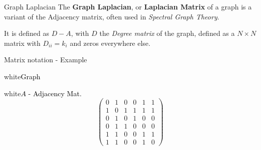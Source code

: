 \begin{textbox}{Graph Laplacian}
  The \textbf{Graph Laplacian}, or \textbf{Laplacian Matrix} of a graph is a variant of the Adjacency matrix, often used in \textit{Spectral Graph Theory}.

  It is defined as $D-A$, with $D$ the \textit{Degree matrix} of the graph, defined as a $N \times N$ matrix with $D_{ii}=k_i$ and zeros everywhere else.
\end{textbox}


\begin{textbox}{Matrix notation - Example}
  \begin{multibox}{2}
    \begin{subbox}{white}{\textcolor{black}{Graph}}
      \centering
      \adjustbox{width=0.8\textwidth }{
        \begin{tikzpicture}[scale=0.3,rotate=0][every node/.style={inner sep=0,outer sep=0}]
          \clip (0,-0.5) rectangle (6,6.5);
          \Vertex[x=1.781,y=1.331,size=0.3,opacity=0.8,label=1]{0}
          \Vertex[x=3.083,y=3.151,size=0.3,opacity=0.8,label=2]{1}
          \Vertex[x=2.831,y=0.200,size=0.3,opacity=0.8,label=6]{5}
          \Vertex[x=4.058,y=1.136,size=0.3,opacity=0.8,label=5]{4}
          \Vertex[x=4.219,y=5.643,size=0.3,opacity=0.8,label=3]{2}
          \Vertex[x=2.386,y=5.800,size=0.3,opacity=0.8,label=4]{3}
          \Edge[](0)(1)
          \Edge[](0)(5)
          \Edge[](0)(4)
          \Edge[](1)(2)
          \Edge[](1)(3)
          \Edge[](1)(4)
          \Edge[](1)(5)
          \Edge[](5)(4)
          \Edge[](4)(4)
          \Edge[](2)(3)
        \end{tikzpicture}
      }%
    \end{subbox}
    \begin{subbox}{white}{\textcolor{black}{$A$ - Adjacency Mat.}}
      \centering
      \footnotesize
      \[\begin{pmatrix}
          0 & 1 & 0 & 0 & 1 & 1 \\
          1 & 0 & 1 & 1 & 1 & 1 \\
          0 & 1 & 0 & 1 & 0 & 0 \\
          0 & 1 & 1 & 0 & 0 & 0 \\
          1 & 1 & 0 & 0 & 1 & 1 \\
          1 & 1 & 0 & 0 & 1 & 0
        \end{pmatrix}
      \]
    \end{subbox}



\end{multibox}
\end{textbox}
